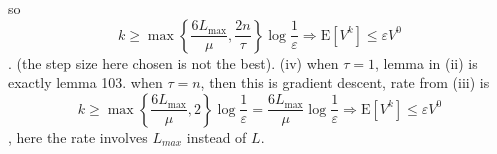 \documentclass[12pt,a4paper]{article}
\begin{document}
so
$$
k \geq \max \left\{\frac{6 L_{\max }}{\mu}, \frac{2n}{\tau}\right\} \log \frac{1}{\varepsilon} \Rightarrow \mathrm{E}\left[V^{k}\right] \leq \varepsilon V^{0}
$$.
(the step size here chosen is not the best).
\newline	
(iv)
when $\tau=1$, lemma in (ii) is exactly lemma 103. when $\tau = n$, then this is gradient descent, rate from (iii) is
$$
k \geq \max \left\{\frac{6 L_{\max }}{\mu}, 2\right\} \log \frac{1}{\varepsilon} =\frac{6 L_{\max }}{\mu}\log \frac{1}{\varepsilon}\Rightarrow \mathrm{E}\left[V^{k}\right] \leq \varepsilon V^{0}
$$, here the rate involves $L_{max}$ instead of $L$.
	
	
	
	
	
	
	
	
	
	
	
	
	
	
	
	
	
	
	
	
	
	
	
	
	
	
	
	
	
	
	
	
	
	
\end{document}
